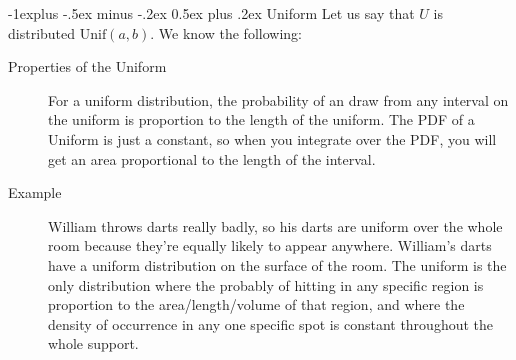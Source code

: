 \documentclass[10pt,landscape]{article}
\makeatletter
\theoremstyle{definition}
\newcommand{\Unif}{\textrm{Unif}}
\renewcommand{\subsection}{\@startsection{subsection}{2}{0mm}%
                                {-1explus -.5ex minus -.2ex}%
                                {0.5ex plus .2ex}%
                                {\normalfont\normalsize\bfseries}}
\makeatother
\begin{document}
\begin{multicols}{3}
\subsection{Uniform} Let us say that $U$ is distributed $\Unif(a, b)$. We know the following:
\begin{description}
    \item[Properties of the Uniform] For a uniform distribution, the probability of an draw from any interval on the uniform is proportion to the length of the uniform. The PDF of a Uniform is just a constant, so when you integrate over the PDF, you will get an area proportional to the length of the interval.
    \item[Example] William throws darts really badly, so his darts are uniform over the whole room because they're equally likely to appear anywhere. William's darts have a uniform distribution on the surface of the room. The uniform is the only distribution where the probably of hitting in any specific region is proportion to the area/length/volume of that region, and where the density of occurrence in any one specific spot is constant throughout the whole support.



\end{description}
\end{multicols}
\end{document}
